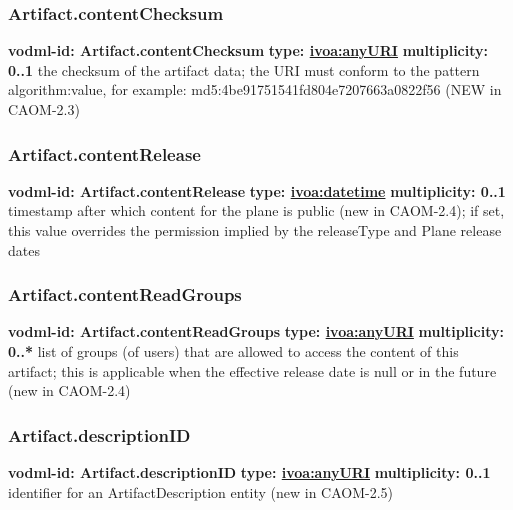     \subsubsection{Artifact.contentChecksum}
      \textbf{vodml-id: Artifact.contentChecksum} \newline
      \textbf{type: \hyperref[sect:ivoa]{ivoa:anyURI}} \newline
      \textbf{multiplicity: 0..1} \newline
      the checksum of the artifact data; the URI must conform to the pattern {algorithm}:{value}, for example: md5:4be91751541fd804e7207663a0822f56 (NEW in CAOM-2.3)

    \subsubsection{Artifact.contentRelease}
      \textbf{vodml-id: Artifact.contentRelease} \newline
      \textbf{type: \hyperref[sect:ivoa]{ivoa:datetime}} \newline
      \textbf{multiplicity: 0..1} \newline
      timestamp after which content for the plane is public (new in CAOM-2.4); if set, this value overrides the permission implied by the releaseType and Plane release dates

    \subsubsection{Artifact.contentReadGroups}
      \textbf{vodml-id: Artifact.contentReadGroups} \newline
      \textbf{type: \hyperref[sect:ivoa]{ivoa:anyURI}} \newline
      \textbf{multiplicity: 0..*} \newline
      list of groups (of users) that are allowed to access the content of this artifact; this is applicable when the effective release date is null or in the future (new in CAOM-2.4)

    \subsubsection{Artifact.descriptionID}
      \textbf{vodml-id: Artifact.descriptionID} \newline
      \textbf{type: \hyperref[sect:ivoa]{ivoa:anyURI}} \newline
      \textbf{multiplicity: 0..1} \newline
      identifier for an ArtifactDescription entity (new in CAOM-2.5)

